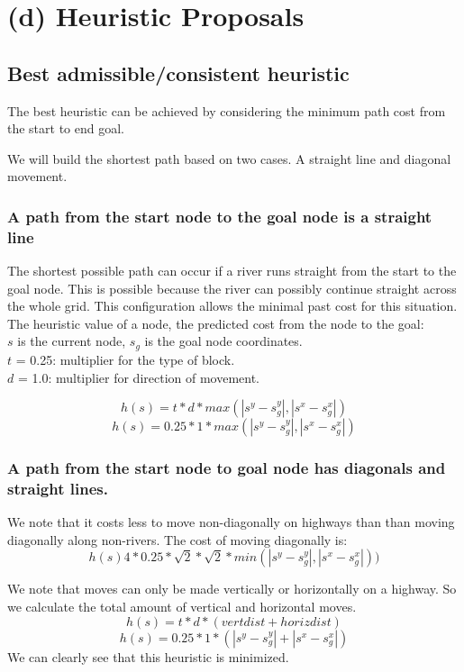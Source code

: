 \section{(d) Heuristic Proposals}



\subsection{Best admissible/consistent heuristic}

The best heuristic can be achieved by considering the minimum path cost from the start to end goal.

We will build the shortest path based on two cases. A straight line and diagonal movement.

\subsubsection{A path from the start node to the goal node is a straight line}

The shortest possible path can occur if a river runs straight from the start to the goal node. This is possible because the river can possibly continue straight across the whole grid. This configuration allows the minimal past cost for this situation. The heuristic value of a node, the predicted cost from the node to the goal:
\\ $s$ is the current node, $s_g$ is the goal node coordinates.
\\ $t$ = 0.25: multiplier for the type of block.
\\ $d$ = 1.0: multiplier for direction of movement.

\[h(s) = t * d  * max(|s^y - s_g^y|,|s^x - s_g^x|)\]
\[h(s) = 0.25 * 1 * max(|s^y - s_g^y|,|s^x - s_g^x|)\]


\subsubsection{A path from the start node to goal node has diagonals and straight lines.}

We note that it costs less to move non-diagonally on highways than than moving diagonally along non-rivers. The cost of moving diagonally is:
\[h(s) 4 * 0.25 * \sqrt{2} * \sqrt{2} * min(|s^y - s_g^y|,|s^x - s_g^x|))\]

We note that moves can only be made vertically or horizontally on a highway. So we calculate the total amount of vertical and horizontal moves.
\[h(s) = t * d  * (vert dist + horiz dist) \]
\[h(s) = 0.25 * 1 * ( |s^y - s_g^y| + |s^x - s_g^x| )\]
We can clearly see that this heuristic is minimized.



